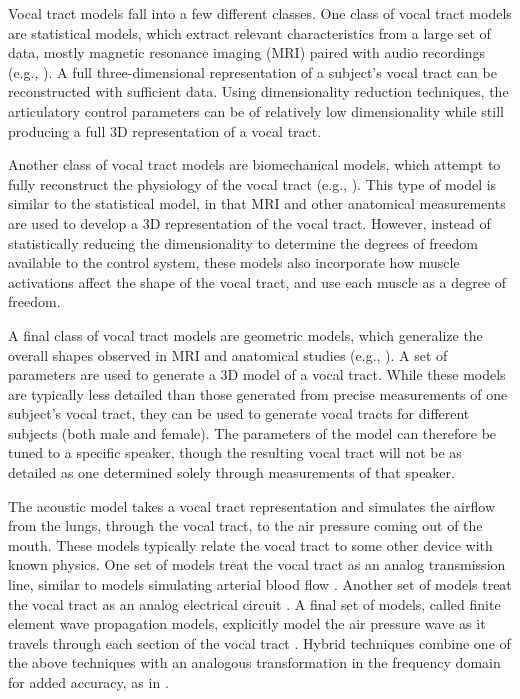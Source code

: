 Vocal tract models
fall into a few different classes.
One class of vocal tract models
are statistical models,
which extract relevant characteristics
from a large set of data,
mostly magnetic resonance imaging (MRI)
paired with audio recordings
(e.g., \citealp{badin2002}).
A full three-dimensional representation
of a subject's vocal tract
can be reconstructed with sufficient data.
Using dimensionality reduction techniques,
the articulatory control parameters
can be of relatively low dimensionality
while still producing a full
3D representation of a vocal tract.

Another class of vocal tract models
are biomechanical models,
which attempt to fully reconstruct
the physiology of the vocal tract
(e.g., \citealp{dang2004}).
This type of model is similar
to the statistical model,
in that MRI and other anatomical measurements
are used to develop a 3D representation
of the vocal tract.
However, instead of statistically
reducing the dimensionality
to determine the degrees of freedom
available to the control system,
these models also incorporate how
muscle activations affect the shape
of the vocal tract,
and use each muscle
as a degree of freedom.

A final class of vocal tract models
are geometric models,
which generalize the overall
shapes observed in
MRI and anatomical studies
(e.g., \citep{mermelstein1973}).
A set of parameters
are used to generate a 3D model
of a vocal tract.
While these models are typically
less detailed than those
generated from precise
measurements of one subject's vocal tract,
they can be used to generate vocal tracts
for different subjects
(both male and female).
The parameters of the model
can therefore be tuned to a specific speaker,
though the resulting vocal tract
will not be as detailed
as one determined solely through
measurements of that speaker.

The acoustic model takes
a vocal tract representation
and simulates the airflow from
the lungs, through the vocal tract,
to the air pressure coming out of the mouth.
These models typically relate
the vocal tract to some other
device with known physics.
One set of models treat the vocal tract
as an analog transmission line,
similar to models simulating
arterial blood flow \citep{meyer1989}.
Another set of models treat the vocal tract
as an analog electrical circuit
\citep{maeda1982}.
A final set of models,
called finite element wave propagation models,
explicitly model the air pressure wave
as it travels through each section
of the vocal tract \citep{elmasri1996}.
Hybrid techniques combine one
of the above techniques
with an analogous transformation
in the frequency domain for added accuracy,
as in \citet{sondhi1987}.

